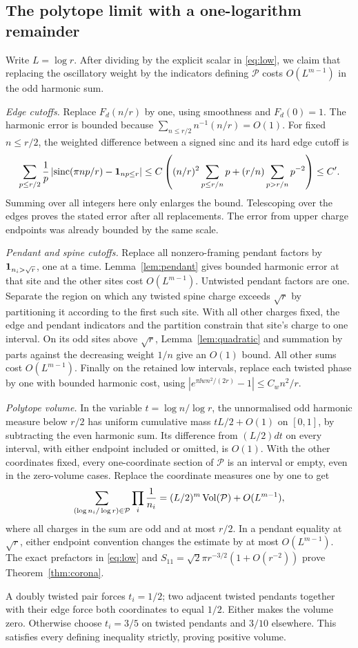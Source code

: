 \subsection{The polytope limit with a one-logarithm remainder}
Write \(L=\log r\). After dividing by the explicit scalar in \eqref{eq:low}, we claim that replacing the oscillatory weight by the indicators defining \(\mathcal P\) costs \(O(L^{m-1})\) in the odd harmonic sum.

\emph{Edge cutoffs.} Replace \(F_d(n/r)\) by one, using smoothness and \(F_d(0)=1\). The harmonic error is bounded because \(\sum_{n\le r/2}n^{-1}(n/r)=O(1)\). For fixed \(n\le r/2\), the weighted difference between a signed sinc and its hard edge cutoff is
\[
 \sum_{p\le r/2}\frac{1}{p}
  \left|\operatorname{sinc}(\pi np/r)-\mathbf 1_{np\le r}\right|
  \le C\left((n/r)^2\sum_{p\le r/n}p
                    +(r/n)\sum_{p>r/n}p^{-2}\right)
  \le C'.
\]
Summing over all integers here only enlarges the bound. Telescoping over the edges proves the stated error after all replacements. The error from upper charge endpoints was already bounded by the same scale.

\emph{Pendant and spine cutoffs.} Replace all nonzero-framing pendant factors by \(\mathbf 1_{n_i>\sqrt r}\), one at a time. Lemma~\ref{lem:pendant} gives bounded harmonic error at that site and the other sites cost \(O(L^{m-1})\). Untwisted pendant factors are one. Separate the region on which any twisted spine charge exceeds \(\sqrt r\) by partitioning it according to the first such site. With all other charges fixed, the edge and pendant indicators and the partition constrain that site's charge to one interval. On its odd sites above \(\sqrt r\), Lemma~\ref{lem:quadratic} and summation by parts against the decreasing weight \(1/n\) give an \(O(1)\) bound. All other sums cost \(O(L^{m-1})\). Finally on the retained low intervals, replace each twisted phase by one with bounded harmonic cost, using \(|e^{\pi\ii w n^2/(2r)}-1|\le C_w n^2/r\).

\emph{Polytope volume.} In the variable \(t=\log n/\log r\), the unnormalised odd harmonic measure below \(r/2\) has uniform cumulative mass \(tL/2+O(1)\) on \([0,1]\), by subtracting the even harmonic sum. Its difference from \((L/2)dt\) on every interval, with either endpoint included or omitted, is \(O(1)\). With the other coordinates fixed, every one-coordinate section of \(\mathcal P\) is an interval or empty, even in the zero-volume cases. Replace the coordinate measures one by one to get
\[
  \sum_{(\log n_i/\log r)\in\mathcal P}
   \prod_i\frac{1}{n_i}
  =(L/2)^m\operatorname{Vol}(\mathcal P)+O(L^{m-1}),
\]
where all charges in the sum are odd and at most \(r/2\). In a pendant equality at \(\sqrt r\), either endpoint convention changes the estimate by at most \(O(L^{m-1})\). The exact prefactors in \eqref{eq:low} and \(S_{11}=\sqrt2\pi r^{-3/2}(1+O(r^{-2}))\) prove Theorem~\ref{thm:corona}.

A doubly twisted pair forces \(t_i=1/2\); two adjacent twisted pendants together with their edge force both coordinates to equal \(1/2\). Either makes the volume zero. Otherwise choose \(t_i=3/5\) on twisted pendants and \(3/10\) elsewhere. This satisfies every defining inequality strictly, proving positive volume.

